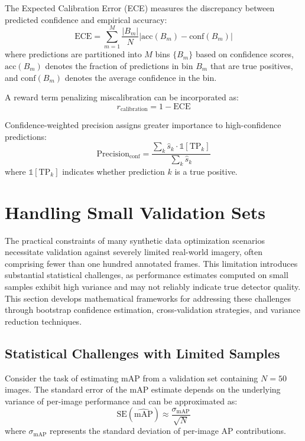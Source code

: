 The Expected Calibration Error (ECE) measures the discrepancy between predicted confidence and empirical accuracy:
\begin{equation}
\text{ECE} = \sum_{m=1}^{M} \frac{|B_m|}{N} \left| \text{acc}(B_m) - \text{conf}(B_m) \right|
\label{eq:ece}
\end{equation}
where predictions are partitioned into $M$ bins $\{B_m\}$ based on confidence scores, $\text{acc}(B_m)$ denotes the fraction of predictions in bin $B_m$ that are true positives, and $\text{conf}(B_m)$ denotes the average confidence in the bin.

A reward term penalizing miscalibration can be incorporated as:
\begin{equation}
r_{\text{calibration}} = 1 - \text{ECE}
\label{eq:calibration_reward}
\end{equation}

Confidence-weighted precision assigns greater importance to high-confidence predictions:
\begin{equation}
\text{Precision}_{\text{conf}} = \frac{\sum_k \hat{s}_k \cdot \mathbb{1}[\text{TP}_k]}{\sum_k \hat{s}_k}
\label{eq:confidence_weighted_precision}
\end{equation}
where $\mathbb{1}[\text{TP}_k]$ indicates whether prediction $k$ is a true positive.

\section{Handling Small Validation Sets}
\label{sec:small_validation}

The practical constraints of many synthetic data optimization scenarios necessitate validation against severely limited real-world imagery, often comprising fewer than one hundred annotated frames. This limitation introduces substantial statistical challenges, as performance estimates computed on small samples exhibit high variance and may not reliably indicate true detector quality. This section develops mathematical frameworks for addressing these challenges through bootstrap confidence estimation, cross-validation strategies, and variance reduction techniques.

\subsection{Statistical Challenges with Limited Samples}

Consider the task of estimating mAP from a validation set containing $N = 50$ images. The standard error of the mAP estimate depends on the underlying variance of per-image performance and can be approximated as:
\begin{equation}
\text{SE}(\widehat{\text{mAP}}) \approx \frac{\sigma_{\text{mAP}}}{\sqrt{N}}
\label{eq:standard_error}
\end{equation}
where $\sigma_{\text{mAP}}$ represents the standard deviation of per-image AP contributions.

